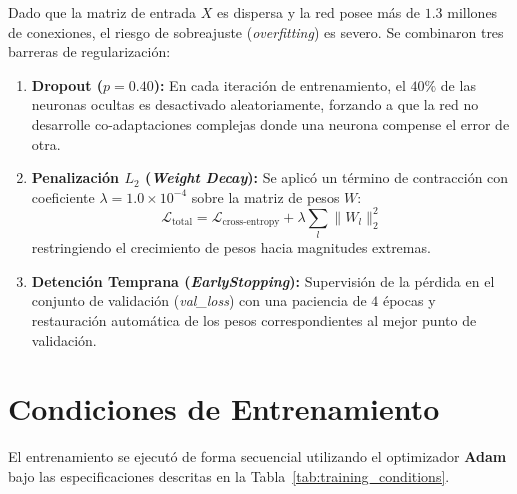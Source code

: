 \documentclass[12pt, a4paper]{article}
\begin{document}
Dado que la matriz de entrada $X$ es dispersa y la red posee más de $1.3$ millones de conexiones, el riesgo de sobreajuste (\textit{overfitting}) es severo. Se combinaron tres barreras de regularización:
\begin{enumerate}
    \item \textbf{Dropout ($p = 0.40$):} En cada iteración de entrenamiento, el $40\%$ de las neuronas ocultas es desactivado aleatoriamente, forzando a que la red no desarrolle co-adaptaciones complejas donde una neurona compense el error de otra.
    \item \textbf{Penalización $L_2$ (\textit{Weight Decay}):} Se aplicó un término de contracción con coeficiente $\lambda = 1.0 \times 10^{-4}$ sobre la matriz de pesos $W$:
    \begin{equation}
        \mathcal{L}_{\text{total}} = \mathcal{L}_{\text{cross-entropy}} + \lambda \sum_{l} \|W_l\|_2^2
    \end{equation}
    restringiendo el crecimiento de pesos hacia magnitudes extremas.
    \item \textbf{Detención Temprana (\textit{EarlyStopping}):} Supervisión de la pérdida en el conjunto de validación (\textit{val\_loss}) con una paciencia de $4$ épocas y restauración automática de los pesos correspondientes al mejor punto de validación.
\end{enumerate}

\section{Condiciones de Entrenamiento}

El entrenamiento se ejecutó de forma secuencial utilizando el optimizador \textbf{Adam} bajo las especificaciones descritas en la Tabla~\ref{tab:training_conditions}.
\end{document}
